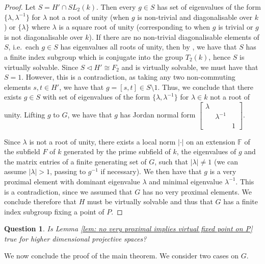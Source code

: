 \documentclass[12pt]{article}
\newtheorem{ques}[thm]{Question}
\theoremstyle{definition}
\begin{document}
\begin{proof}
    Let $S = H' \cap SL_2 (k)$. Then every $g \in S$ has set of eigenvalues of the form $\{\lambda, \lambda^{-1}\}$ for $\lambda$ not a root of unity (when $g$ is non-trivial and diagonalisable over $k$) or $\{\lambda\}$ where $\lambda$ is a square root of unity (corresponding to when $g$ is trivial or $g$ is not diagonalisable over $k$). If there are no non-trivial diagonalisable elements of $S$, i.e.\ each $g \in S$ has eigenvalues all roots of unity, then by \cite[Proposition 14.44]{KapDrutu}, we have that $S$ has a finite index subgroup which is conjugate into the group $T_2(k)$, hence $S$ is virtually solvable. Since $S \triangleleft H' \cong F_2$ and is virtually solvable, we must have that $S = 1$. However, this is a contradiction, as taking any two non-commuting elements $s,t \in H'$, we have that $g = [s,t] \in S \setminus 1$. Thus, we conclude that there exists $g \in S$ with set of eigenvalues of the form $\{\lambda, \lambda^{-1}\}$ for $\lambda \in k$ not a root of unity. Lifting $g$ to $G$, we have that $g$ has Jordan normal form $\begin{bmatrix}
        \lambda & & \\
        & \lambda^{-1} & \\
        & & 1
    \end{bmatrix}$.

    Since $\lambda$ is not a root of unity, there exists a local norm $\vert \cdot \vert$ on an extension $\mathbb{F}$ of the subfield $F$ of $k$ generated by the prime subfield of $k$, the eigenvalues of $g$ and the matrix entries of a finite generating set of $G$, such that $\vert \lambda \vert \neq 1$ (we can assume $\vert \lambda \vert > 1$, passing to $g^{-1}$ if necessary). We then have that $g$ is a very proximal element with dominant eigenvalue $\lambda$ and minimal eigenvalue $\lambda^{-1}$. This is a contradiction, since we assumed that $G$ has no very proximal elements. We conclude therefore that $H$ must be virtually solvable and thus that $G$ has a finite index subgroup fixing a point of $P$. 
\end{proof}

\begin{ques}
    Is Lemma \ref{lem: no very proximal implies virtual fixed point on P} true for higher dimensional projective spaces?
\end{ques}

We now conclude the proof of the main theorem. We consider two cases on $G$. 
\end{document}
